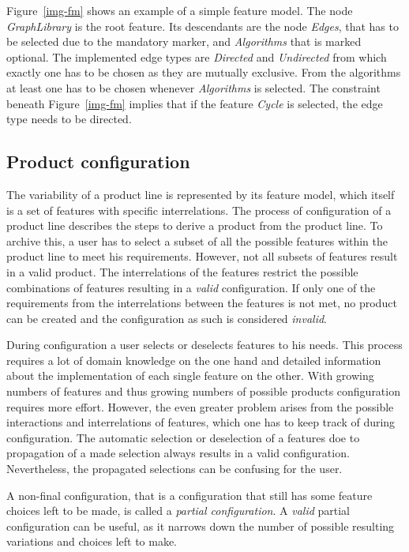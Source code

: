 Figure~\ref{img-fm} shows an example of a simple feature model. The node \textit{GraphLibrary} is the root feature. Its descendants are the node \textit{Edges}, that has to be selected due to the mandatory marker, and \textit{Algorithms} that is marked optional. The implemented edge types are \textit{Directed} and \textit{Undirected} from which exactly one has to be chosen as they are mutually exclusive. From the algorithms at least one has to be chosen whenever \textit{Algorithms} is selected. The constraint beneath Figure~\ref{img-fm} implies that if the feature \textit{Cycle} is selected, the edge type needs to be directed.

\subsection{Product configuration}
The variability of a product line is represented by its feature model, which itself is a set of features with specific interrelations. The process of configuration of a product line describes the steps to derive a product from the product line. To archive this, a user has to select a subset of all the possible features within the product line to meet his requirements. However, not all subsets of features result in a valid product. The interrelations of the features restrict the possible combinations of features resulting in a \textit{valid} configuration. If only one of the requirements from the interrelations between the features is not met, no product can be created and the configuration as such is considered \textit{invalid}.

During configuration a user selects or deselects features to his needs. This process requires a lot of domain knowledge on the one hand and detailed information about the implementation of each single feature on the other. With growing numbers of features and thus growing numbers of possible products configuration requires more effort. However, the even greater problem arises from the possible interactions and interrelations of features, which one has to keep track of during configuration. The automatic selection or deselection of a features doe to propagation of a made selection always results in a valid configuration. Nevertheless, the propagated selections can be confusing for the user. 

A non-final configuration, that is a configuration that still has some feature choices left to be made, is called a \textit{partial configuration}. A \textit{valid} partial configuration can be useful, as it narrows down the number of possible resulting variations and choices left to make.

